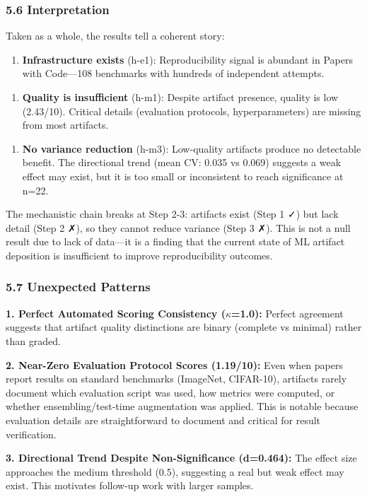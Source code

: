 \subsubsection{5.6 Interpretation}

Taken as a whole, the results tell a coherent story:

\begin{enumerate}
\item \textbf{Infrastructure exists} (h-e1): Reproducibility signal is abundant in Papers with Code---108 benchmarks with hundreds of independent attempts.
\end{enumerate}

\begin{enumerate}
\item \textbf{Quality is insufficient} (h-m1): Despite artifact presence, quality is low (2.43/10). Critical details (evaluation protocols, hyperparameters) are missing from most artifacts.
\end{enumerate}

\begin{enumerate}
\item \textbf{No variance reduction} (h-m3): Low-quality artifacts produce no detectable benefit. The directional trend (mean CV: 0.035 vs 0.069) suggests a weak effect may exist, but it is too small or inconsistent to reach significance at n=22.
\end{enumerate}

The mechanistic chain breaks at Step 2-3: artifacts exist (Step 1 ✓) but lack detail (Step 2 ✗), so they cannot reduce variance (Step 3 ✗). This is not a null result due to lack of data---it is a finding that the current state of ML artifact deposition is insufficient to improve reproducibility outcomes.

\subsubsection{5.7 Unexpected Patterns}

\textbf{1. Perfect Automated Scoring Consistency ($\kappa$=1.0):} Perfect agreement suggests that artifact quality distinctions are binary (complete vs minimal) rather than graded.

\textbf{2. Near-Zero Evaluation Protocol Scores (1.19/10):} Even when papers report results on standard benchmarks (ImageNet, CIFAR-10), artifacts rarely document which evaluation script was used, how metrics were computed, or whether ensembling/test-time augmentation was applied. This is notable because evaluation details are straightforward to document and critical for result verification.

\textbf{3. Directional Trend Despite Non-Significance (d=0.464):} The effect size approaches the medium threshold (0.5), suggesting a real but weak effect may exist. This motivates follow-up work with larger samples.
